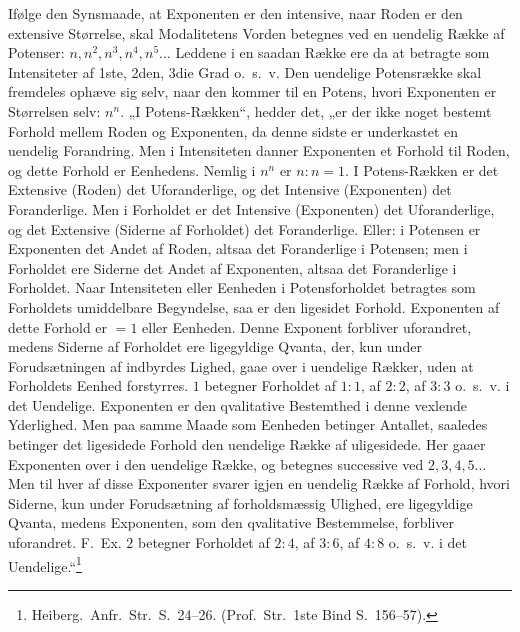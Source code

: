 \documentclass[12pt]{book}
\newcommand{\opage}[1]{\marginnote{\footnotesize\textit{[#1]}}}
\begin{document}
Ifølge den Synsmaade, at Exponenten er den intensive, naar Roden er den extensive Størrelse, skal
Modalitetens Vorden betegnes ved en uendelig Række af Potenser: $n, n^{2}, n^{3}, n^{4}, n^{5} \ldots$
Leddene i en saadan Række ere da at betragte som Intensiteter af 1ste, 2den, 3die Grad o.\ s.\ v. Den
uendelige Potensrække skal fremdeles ophæve sig selv, naar den kommer til en Potens, hvori Exponenten er
Størrelsen selv: $n^{n}$. „I Potens-Rækken“, hedder det, „er der ikke noget bestemt Forhold mellem Roden
og Exponenten, da denne sidste er underkastet en uendelig Forandring. Men i Intensiteten danner
Exponenten et Forhold til Roden, og dette Forhold er Eenhedens. Nemlig i $n^{n}$ er $n : n = 1$. I
Potens-Rækken er det Extensive (Roden) det Uforanderlige, og det Intensive (Exponenten) det Foranderlige.
Men i Forholdet er det Intensive (Exponenten) det Uforanderlige, og det Extensive (Siderne af Forholdet)
det Foranderlige. Eller: i Potensen er Exponenten det Andet af Roden, altsaa det Foranderlige i Potensen;
men i Forholdet ere Siderne det Andet af Exponenten, altsaa det Foranderlige i Forholdet. Naar
Intensiteten eller Eenheden i Potensforholdet betragtes som Forholdets umiddelbare Begyndelse, saa er den
ligesidet
\opage{307} Forhold. Exponenten af dette Forhold er $= 1$ eller Eenheden. Denne Exponent forbliver uforandret, medens
Siderne af Forholdet ere ligegyldige Qvanta, der, kun under Forudsætningen af indbyrdes Lighed, gaae over
i uendelige Rækker, uden at Forholdets Eenhed forstyrres. $1$ betegner Forholdet af $1 : 1$, af $2 : 2$,
af $3 : 3$ o.\ s.\ v. i det Uendelige. Exponenten er den qvalitative Bestemthed i denne vexlende
Yderlighed. Men paa samme Maade som Eenheden betinger Antallet, saaledes betinger det ligesidede Forhold
den uendelige Række af uligesidede. Her gaaer Exponenten over i den uendelige Række, og betegnes
successive ved $2, 3, 4, 5 \ldots$ Men til hver af disse Exponenter svarer igjen en uendelig Række af
Forhold, hvori Siderne, kun under Forudsætning af forholdsmæssig Ulighed, ere ligegyldige Qvanta, medens
Exponenten, som den qvalitative Bestemmelse, forbliver uforandret. F.\ Ex. $2$ betegner Forholdet af
$2 : 4$, af $3 : 6$, af $4 : 8$ o.\ s.\ v. i det Uendelige.“\footnote{Heiberg.\ Anfr.\ Str.\ S.~24--26.
(Prof.\ Str.\ 1ste Bind S.~156--57).}
\end{document}

